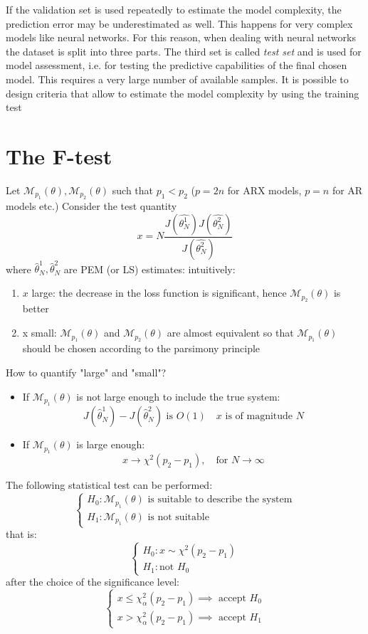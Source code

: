 \documentclass{book}
\theoremstyle{definition}
\theoremstyle{remark}
\theoremstyle{remark}
\begin{document}
If the validation set is used repeatedly to estimate the model complexity, the prediction error may be underestimated as well. This happens for very complex models like neural networks. For this reason, when dealing with neural networks the dataset is split into three parts. The third set is called \emph{test set} and is used for model assessment, i.e. for testing the predictive capabilities of the final chosen model. This requires a very large number of available samples. It is possible to design criteria that allow to estimate the model complexity by using the training test

\section{The F-test}
Let $\mathcal{M}_{p_1}(\theta),\mathcal{M}_{p_2}(\theta)$ such that $p_1<p_2$ ($p=2n$ for ARX models, $p=n$ for AR models etc.) Consider the test quantity
\[
    x=N\displaystyle\frac{J(\hat{\theta^1_N})J(\hat{\theta^2_N})}{J(\hat{\theta^2_N})}
\]
where $\hat{\theta}^1_N,\hat{\theta}^2_N$ are PEM (or LS) estimates: intuitively:
\begin{enumerate}
    \item $x$ large: the decrease in the loss function is significant, hence $\mathcal{M}_{p_2}(\theta)$ is better
    \item x small: $\mathcal{M}_{p_1}(\theta)$ and $\mathcal{M}_{p_2}(\theta)$ are almost equivalent so that $\mathcal{M}_{p_1}(\theta)$ should be chosen according to the parsimony principle
\end{enumerate}
How to quantify "large" and "small"?
\begin{itemize}
    \item If $\mathcal{M}_{p_1}(\theta)$ is not large enough to include the true system: \[
            J(\hat{\theta}_N^1)-J(\hat{\theta}_N^2) \text{ is } O(1) \quad x\text{ is of magnitude } N
    \]
    \item If $\mathcal{M}_{p_1}(\theta)$ is large enough: \[
            x \to \chi^2(p_2-p_1), \quad \text{for } N\to\infty
    \]
\end{itemize}
The following statistical test can be performed:
\[
    \begin{cases}
        H_0:\mathcal{M}_{p_1}(\theta) \text{ is suitable to describe the system}\\
        H_1:\mathcal{M}_{p_1}(\theta) \text{ is not suitable }
    \end{cases}
\]
that is:
\[
    \begin{cases}
        H_0: x \sim \chi^2(p_2-p_1)\\
        H_1: \text{not }H_0
    \end{cases}
\]
after the choice of the significance level:
\[
    \begin{cases}
        x\leq \chi^2_\alpha(p_2-p_1) \implies \text{ accept }H_0\\
        x>\chi^2_\alpha(p_2-p_1) \implies \text{ accept }H_1
    \end{cases}
\]
\end{document}
